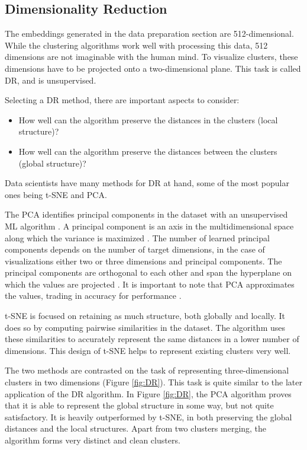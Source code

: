 \subsection{Dimensionality Reduction}

The embeddings generated in the data preparation section are 512-dimensional. While the clustering algorithms work well with processing this data, 512 dimensions are not imaginable with the human mind. To visualize clusters, these dimensions have to be projected onto a two-dimensional plane. This task is called \ac{DR}, and is unsupervised. 

Selecting a \ac{DR} method, there are important aspects to consider:
\begin{itemize}
	\item How well can the algorithm preserve the distances in the clusters (local structure)?
	\item How well can the algorithm preserve the distances between the clusters (global structure)?
\end{itemize}

Data scientists have many methods for \ac{DR} at hand, some of the most popular ones being \ac{t-SNE} and \ac{PCA}.

The \ac{PCA} identifies principal components in the dataset with an unsupervised \ac{ML} algorithm \cite{40algorithms}. A principal component is an axis in the multidimensional space along which the variance is maximized \cite{pcaVStsne}. The number of learned principal components depends on the number of target dimensions, in the case of visualizations either two or three dimensions and principal components. The principal components are orthogonal to each other and span the hyperplane on which the values are projected \cite{pcaVStsne}.
It is important to note that \ac{PCA} approximates the values, trading in accuracy for performance \cite{40algorithms}.

\ac{t-SNE} is focused on retaining as much structure, both globally and locally. It does so by computing pairwise similarities in the dataset. The algorithm uses these similarities to accurately represent the same distances in a lower number of dimensions. This design of \ac{t-SNE} helps to represent existing clusters very well.

The two methods are contrasted on the task of representing three-dimensional clusters in two dimensions (Figure \ref{fig:DR}). This task is quite similar to the later application of the \ac{DR} algorithm. In Figure \ref{fig:DR}, the \ac{PCA} algorithm proves that it is able to represent the global structure in some way, but not quite satisfactory. It is heavily outperformed by \ac{t-SNE}, in both preserving the global distances and the local structures. Apart from two clusters merging, the algorithm forms very distinct and clean clusters.

